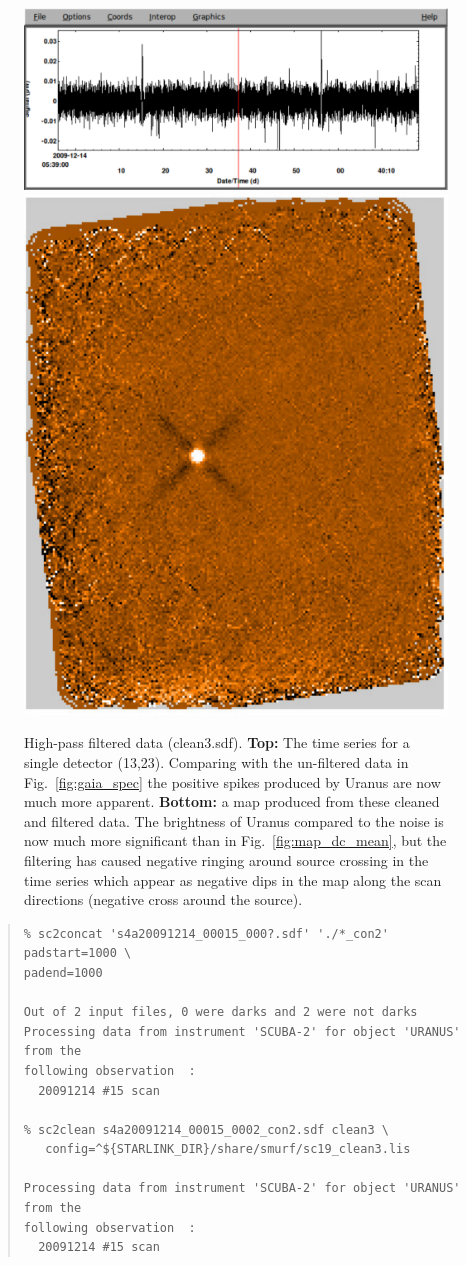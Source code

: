 \documentclass[twoside,11pt]{article}
\newenvironment{myquote}{\begin{quote}\begin{small}}{\end{small}\end{quote}}
\renewcommand{\_}{\texttt{\symbol{95}}}
\begin{document}
\begin{figure}
\begin{center}
\includegraphics[width=\linewidth]{sc19_spec_filt} \\
\vspace{0.3in}
\includegraphics[width=0.5\linewidth]{sc19_map_highpass}
\caption{High-pass filtered data (clean3.sdf). {\bf Top:} The time
  series for a single detector (13,23). Comparing with the un-filtered
  data in Fig.~\ref{fig:gaia_spec} the positive spikes produced by
  Uranus are now much more apparent. {\bf Bottom:} a map produced from
  these cleaned and filtered data. The brightness of Uranus compared
  to the noise is now much more significant than in
  Fig.~\ref{fig:map_dc_mean}, but the filtering has caused negative
  ringing around source crossing in the time series which appear as
  negative dips in the map along the scan directions (negative cross
  around the source).}
\label{fig:highpass}
\end{center}
\end{figure}

\begin{myquote}
\begin{verbatim}
% sc2concat 's4a20091214_00015_000?.sdf' './*_con2' padstart=1000 \
padend=1000

Out of 2 input files, 0 were darks and 2 were not darks
Processing data from instrument 'SCUBA-2' for object 'URANUS' from the
following observation  :
  20091214 #15 scan

% sc2clean s4a20091214_00015_0002_con2.sdf clean3 \
   config=^${STARLINK_DIR}/share/smurf/sc19_clean3.lis

Processing data from instrument 'SCUBA-2' for object 'URANUS' from the
following observation  :
  20091214 #15 scan

\end{verbatim}
\end{myquote}
\end{document}
